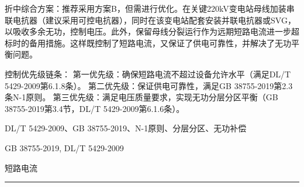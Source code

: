 \documentclass[12pt,a4paper]{ctexart}
\begin{document}
\begin{description}[leftmargin=1.5em,style=nextline,font=\normalfont]
折中综合方案：推荐采用方案B，但需进行优化。在关键220kV变电站母线加装串联电抗器（建议采用可控电抗器），同时在该变电站配套安装并联电抗器或SVG，以吸收多余无功，控制电压。此外，保留母线分裂运行作为远期短路电流进一步超标时的备用措施。这样既控制了短路电流，又保证了供电可靠性，并解决了无功平衡问题。

控制优先级链条：
第一优先级：确保短路电流不超过设备允许水平（满足DL/T 5429-2009第6.1.8条）。
第二优先级：保证供电可靠性，满足GB 38755-2019第2.3条N-1原则。
第三优先级：满足电压质量要求，实现无功分层分区平衡（GB 38755-2019第3.4节，DL/T 5429-2009第6.1.6条）。
  \item[KW:] DL/T 5429-2009、GB 38755-2019、N-1原则、分层分区、无功补偿
  \item[Std:] GB 38755-2019, DL/T 5429-2009
  \item[Topic:] 短路电流
\end{description}
\vspace{4pt}
\hrule\vspace{6pt}
\end{document}
